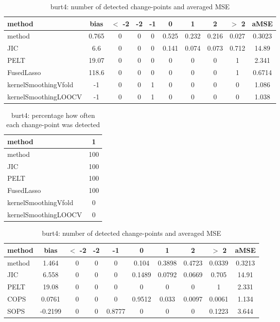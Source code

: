 \begin{table}[ht]
\centering
\begin{tabular}{l|c|ccccccc|c}
  \hline
method & bias & $<$ -2 & -2 & -1 & 0 & 1 & 2 & $>$ 2 & aMSE \\ 
  \hline
method & 0.765 &     0 &     0 &     0 & 0.525 & 0.232 & 0.216 & 0.027 & 0.3023 \\ 
  JIC &   6.6 &     0 &     0 &     0 & 0.141 & 0.074 & 0.073 & 0.712 & 14.89 \\ 
  PELT & 19.07 &     0 &     0 &     0 &     0 &     0 &     0 &     1 & 2.341 \\ 
  FusedLasso & 118.6 &     0 &     0 &     0 &     0 &     0 &     0 &     1 & 0.6714 \\ 
  kernelSmoothingVfold &    -1 &     0 &     0 &     1 &     0 &     0 &     0 &     0 & 1.086 \\ 
  kernelSmoothingLOOCV &    -1 &     0 &     0 &     1 &     0 &     0 &     0 &     0 & 1.038 \\ 
   \hline
\end{tabular}
\caption{burt4: number of detected change-points and averaged MSE} 
\label{tab:burt4Njumps}
\end{table}
\begin{table}[ht]
\centering
\begin{tabular}{l|c}
  \hline
method & 1 \\ 
  \hline
method &    100 \\ 
  JIC &    100 \\ 
  PELT &    100 \\ 
  FusedLasso &    100 \\ 
  kernelSmoothingVfold &      0 \\ 
  kernelSmoothingLOOCV &      0 \\ 
   \hline
\end{tabular}
\caption{burt4: percentage how often each change-point was detected} 
\label{tab:burt4Detections}
\end{table}
\begin{table}[ht]
\centering
\begin{tabular}{l|c|ccccccc|c}
  \hline
method & bias & $<$ -2 & -2 & -1 & 0 & 1 & 2 & $>$ 2 & aMSE \\ 
  \hline
method & 1.464 &     0 &     0 &     0 & 0.104 & 0.3898 & 0.4723 & 0.0339 & 0.3213 \\ 
  JIC & 6.558 &     0 &     0 &     0 & 0.1489 & 0.0792 & 0.0669 & 0.705 & 14.91 \\ 
  PELT & 19.08 &     0 &     0 &     0 &     0 &     0 &     0 &     1 & 2.331 \\ 
  COPS & 0.0761 &     0 &     0 &     0 & 0.9512 & 0.033 & 0.0097 & 0.0061 & 1.134 \\ 
  SOPS & -0.2199 &     0 &     0 & 0.8777 &     0 &     0 &     0 & 0.1223 & 3.644 \\ 
   \hline
\end{tabular}
\caption{burt4: number of detected change-points and averaged MSE} 
\label{tab:burt4Njumps}
\end{table}
